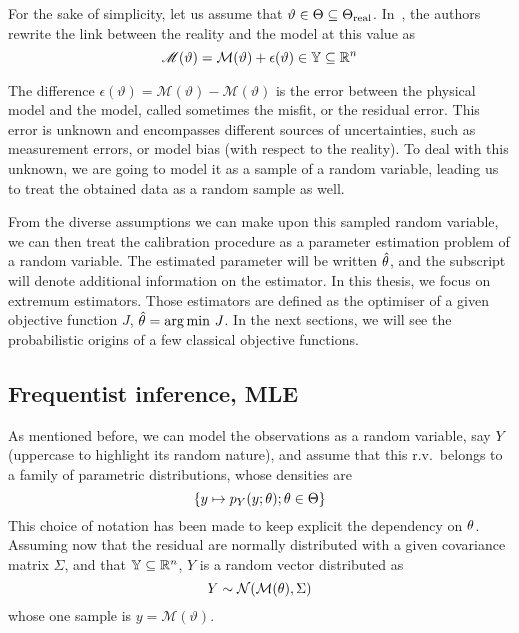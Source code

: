 \documentclass[../../Main_ManuscritThese.tex]{subfiles}
\begin{document}
For the sake of simplicity, let us assume that
$\vartheta \in \Theta \subseteq
\Theta_{\mathrm{real}}$. In~\cite{kennedy_bayesian_2001,higdon_combining_2004},
the authors rewrite the link between the reality and the model at this
value as
\begin{equation}
  \label{eq:vartheta_models}
    \mathscr{M}(\vartheta) = %
    \mathcal{M}(\vartheta) + \epsilon(\vartheta) \in \Yspace \subseteq \mathbb{R}^n
  \end{equation}
 
  The difference
  $\epsilon(\vartheta) = \mathscr{M}(\vartheta) -
  \mathcal{M}(\vartheta)$ is the error between the physical model and
  the model, called sometimes the misfit, or the residual error.  This
  error is unknown and encompasses different sources of uncertainties,
  such as measurement errors, or model bias (with respect to the
  reality). To deal with this unknown, we are going to model it as a
  sample of a random variable, leading us to treat the obtained data
  as a random sample as well.

  From the diverse assumptions we can make upon this sampled random
  variable, we can then treat the calibration procedure as a parameter
  estimation problem of a random variable.  The estimated parameter
  will be written $\hat{\theta}$, and the subscript will denote
  additional information on the estimator.  In this thesis, we focus
  on extremum estimators. Those estimators are defined as the
  optimiser of a given objective function $J$,
  $\hat{\theta} = \operatorname*{arg\,min \,} J$. In the next sections, we will see the
  probabilistic origins of a few classical objective functions.
\subsection{Frequentist inference, MLE}
\label{sec:frequentist_inference_MLE}
As mentioned before, we can model the observations as a random
variable, say $Y$ (uppercase to highlight its random nature), and
assume that this r.v.\ belongs to a family of parametric
distributions, whose densities are
\begin{equation}
  \label{eq:family_pdf}
  \left\{y\mapsto p_{Y}(y; \theta) ; \theta\in\Theta \right\}
\end{equation}
This choice of notation has been made to keep explicit the dependency
on $\theta$. Assuming now that the residual are normally distributed
with a given covariance matrix $\Sigma$, and that
$\mathbb{Y} \subseteq \mathbb{R}^n$, $Y$ is a random vector distributed
as
\begin{equation}
  \label{eq:lik_gaussian}
  Y  \sim \mathcal{N}(\mathcal{M}(\theta), \Sigma)
\end{equation}
whose one sample is $y=\mathscr{M}(\vartheta)$.
\end{document}
